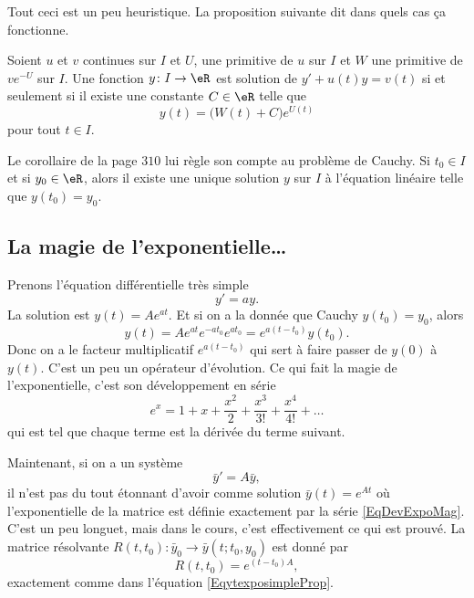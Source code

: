 Tout ceci est un peu heuristique. La proposition suivante dit dans quels cas ça fonctionne.
\begin{proposition}
Soient $u$ et $v$ continues sur $I$ et $U$, une primitive de $u$ sur $I$ et $W$ une primitive de $v e^{-U}$ sur $I$. Une fonction $y\colon I\to \eR$ est solution de $y'+u(t)y=v(t)$ si et seulement si il existe une constante $C\in \eR$ telle que
\begin{equation}
	y(t)=\big( W(t)+C \big) e^{U(t)}
\end{equation}
pour tout $t\in I$.
\end{proposition}
Le corollaire de la page $310$ lui règle son compte au problème de Cauchy. Si $t_0\in I$ et si $y_0\in\eR$, alors il existe une unique solution $y$ sur $I$ à l'équation linéaire telle que $y(t_0)=y_0$.

					\subsection{La magie de l'exponentielle\ldots}

Prenons l'équation différentielle très simple
\begin{equation}
	y'=ay.
\end{equation}
La solution est $y(t)=A e^{at}$. Et si on a la donnée que Cauchy $y(t_0)=y_0$, alors
\begin{equation}		\label{EqytexposimpleProp}
	y(t)=A e^{at} e^{-at_0} e^{at_0}= e^{a(t-t_0)}y(t_0).
\end{equation}
Donc on a le facteur multiplicatif $ e^{a(t-t_0)}$ qui sert à faire passer de $y(0)$ à $y(t)$. C'est un peu un opérateur d'évolution. Ce qui fait la magie  de l'exponentielle, c'est son développement en série
\begin{equation}		\label{EqDevExpoMag}
	e^x=1+x+\frac{ x^2 }{ 2 }+\frac{ x^3 }{ 3! }+\frac{ x^4 }{ 4! }+\ldots
\end{equation}
qui est tel que chaque terme est la dérivée du terme suivant.

Maintenant, si on a un système
\begin{equation}
	\bar y'=A\bar y,
\end{equation}
il n'est pas du tout étonnant d'avoir comme solution $\bar y(t)= e^{At}$ où l'exponentielle de la matrice est définie exactement par la série \eqref{EqDevExpoMag}. C'est un peu longuet, mais dans le cours, c'est effectivement ce qui est prouvé. La matrice résolvante $R(t,t_0)\colon \bar y_0\to \bar y(t;t_0,y_0)$ est donné par
\begin{equation}
	R(t,t_0)= e^{(t-t_0)A},
\end{equation}
exactement comme dans l'équation \eqref{EqytexposimpleProp}.

